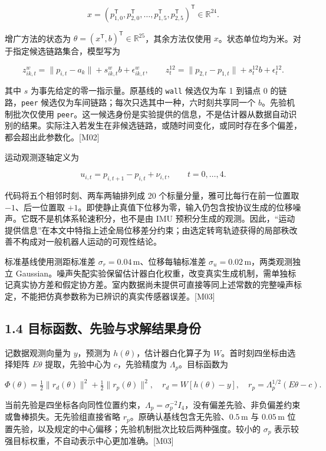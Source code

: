 \documentclass[12pt,a4paper]{article}
\begin{document}
\[x=(p_{1,0}^{\mathsf T},p_{2,0}^{\mathsf T},\ldots,p_{1,5}^{\mathsf T},p_{2,5}^{\mathsf T})^{\mathsf T}\in\mathbb R^{24}.\]

增广方法的状态为
\(\theta=(x^{\mathsf T},b)^{\mathsf T}\in\mathbb R^{25}\)，其余方法仅使用
\(x\)。状态单位均为米。对于指定候选链路集合，模型写为

\[z^{w}_{ik,t}=\|p_{i,t}-a_k\|+s^{w}_{ik,t}b+\epsilon^{w}_{ik,t},\qquad
z^{12}_{t}=\|p_{2,t}-p_{1,t}\|+s^{12}_{t}b+\epsilon^{12}_{t}.\]

其中 \(s\) 为事先给定的零一指示量。原基线的 \texttt{wall} 候选仅为车 1
到锚点 0 的链路，\texttt{peer}
候选仅为车间链路；每次只选其中一种，六时刻共享同一个
\(b\)。先验机制批次仅使用
\texttt{peer}。这一候选身份是实验提供的信息，不是估计器从数据自动识别的结果。实际注入若发生在非候选链路，或随时间变化，或同时存在多个偏差，都会超出此参数化。{[}M02{]}

运动观测逐轴定义为

\[u_{i,t}=p_{i,t+1}-p_{i,t}+\nu_{i,t},\qquad t=0,\ldots,4.\]

代码将五个相邻时刻、两车两轴排列成 20 个标量分量，雅可比每行在前一位置取
\(-1\)、后一位置取
\(+1\)。即使静止真值下位移为零，输入仍包含按协议生成的位移噪声。它既不是机体系轮速积分，也不是由
IMU
预积分生成的观测。因此，``运动提供信息''在本文中特指上述全局位移差分约束；由选定转弯轨迹获得的局部秩改善不构成对一般机器人运动的可观性结论。

标准基线使用测距标准差 \(\sigma_r=0.04\,\mathrm m\)、位移每轴标准差
\(\sigma_u=0.02\,\mathrm m\)，两类观测独立
Gaussian。噪声失配实验保留估计器白化权重，改变真实生成机制，需单独标记真实协方差和假定协方差。室内数据尚未提供可直接等同上述常数的完整噪声标定，不能把仿真参数称为已辨识的真实传感器误差。{[}M03{]}

\subsection{1.4
目标函数、先验与求解结果身份}\label{ux76eeux6807ux51fdux6570ux5148ux9a8cux4e0eux6c42ux89e3ux7ed3ux679cux8eabux4efd}

记数据观测向量为 \(y\)，预测为 \(h(\theta)\)，估计器白化算子为
\(W\)。首时刻四坐标由选择矩阵 \(E\theta\) 提取，先验中心为
\(c\)，先验精度为 \(\Lambda_p\)。目标函数为

\[\Phi(\theta)=\tfrac12\|r_d(\theta)\|^2+\tfrac12\|r_p(\theta)\|^2,
\quad r_d=W[h(\theta)-y],\quad r_p=\Lambda_p^{1/2}(E\theta-c).\]

当前先验是四坐标各向同性位置约束，\(\Lambda_p=\sigma_p^{-2}I_4\)，没有偏差先验、非负偏差约束或鲁棒损失。无先验组直接省略
\(r_p\)。原确认基线包含无先验、\(0.5\,\mathrm m\) 与 \(0.05\,\mathrm m\)
位置先验，以及规定的中心偏移；先验机制批次比较后两种强度。较小的
\(\sigma_p\) 表示较强目标权重，不自动表示中心更加准确。{[}M03{]}
\end{document}
